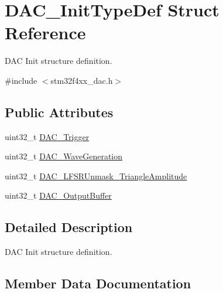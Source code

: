 \hypertarget{struct_d_a_c___init_type_def}{}\section{D\+A\+C\+\_\+\+Init\+Type\+Def Struct Reference}
\label{struct_d_a_c___init_type_def}


D\+AC Init structure definition.  




{\ttfamily \#include $<$stm32f4xx\+\_\+dac.\+h$>$}

\subsection*{Public Attributes}
\begin{DoxyCompactItemize}
\item 
uint32\+\_\+t \hyperlink{struct_d_a_c___init_type_def_a7b26ebaeb51a0157a781f7de8ba779e5}{D\+A\+C\+\_\+\+Trigger}
\item 
uint32\+\_\+t \hyperlink{struct_d_a_c___init_type_def_a6753e78ddd2dc8273444ba01a272d63a}{D\+A\+C\+\_\+\+Wave\+Generation}
\item 
uint32\+\_\+t \hyperlink{struct_d_a_c___init_type_def_a27ed27a544d50781b20d59cc55e6cef8}{D\+A\+C\+\_\+\+L\+F\+S\+R\+Unmask\+\_\+\+Triangle\+Amplitude}
\item 
uint32\+\_\+t \hyperlink{struct_d_a_c___init_type_def_ad3e9e01486443e99f19e65a446b03ca6}{D\+A\+C\+\_\+\+Output\+Buffer}
\end{DoxyCompactItemize}


\subsection{Detailed Description}
D\+AC Init structure definition. 

\subsection{Member Data Documentation}
